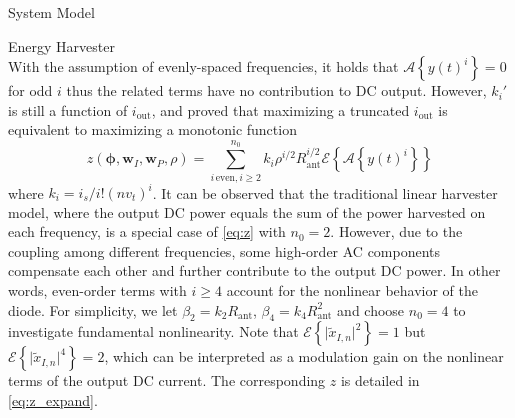 \documentclass[journal]{IEEEtran}
\begin{document}
\begin{section}{System Model}
\begin{subsection}{Energy Harvester}
\begin{equation}
			\end{equation}
			With the assumption of evenly-spaced frequencies, it holds that $\mathcal{A}\left\{y(t)^i\right\}=0$ for odd $i$ thus the related terms have no contribution to DC output. However, $k_i'$ is still a function of $i_{\text{out}}$, and \cite{Clerckx2016a} proved that maximizing a truncated $i_{\text{out}}$ is equivalent to maximizing a monotonic function
			\begin{equation}\label{eq:z}
				z(\boldsymbol{\phi},\boldsymbol{w}_I,\boldsymbol{w}_P,\rho)=\sum_{i\,\text{even},i\ge2}^{n_0}{k_i}{\rho^{i/2}}{R_{\text{ant}}^{i/2}}{\mathcal{E}\left\{\mathcal{A}\left\{y(t)^i\right\}\right\}}
			\end{equation}
			where $k_i=i_s/i!(nv_t)^i$. It can be observed that the traditional linear harvester model, where the output DC power equals the sum of the power harvested on each frequency, is a special case of \ref{eq:z} with $n_0=2$. However, due to the coupling among different frequencies, some high-order AC components compensate each other and further contribute to the output DC power. In other words, even-order terms with $i \ge 4$ account for the nonlinear behavior of the diode. For simplicity, we let $\beta_2={k_2}{R_{\text{ant}}}$, $\beta_4={k_4}{R_{\text{ant}}^2}$ and choose $n_0=4$ to investigate fundamental nonlinearity. Note that $\mathcal{E}\left\{\lvert\tilde{x}_{I,n}\rvert^2\right\}=1$ but $\mathcal{E}\left\{\lvert\tilde{x}_{I,n}\rvert^4\right\}=2$, which can be interpreted as a modulation gain on the nonlinear terms of the output DC current. The corresponding $z$ is detailed in \ref{eq:z_expand}.


\end{subsection}
\end{section}
\end{document}
